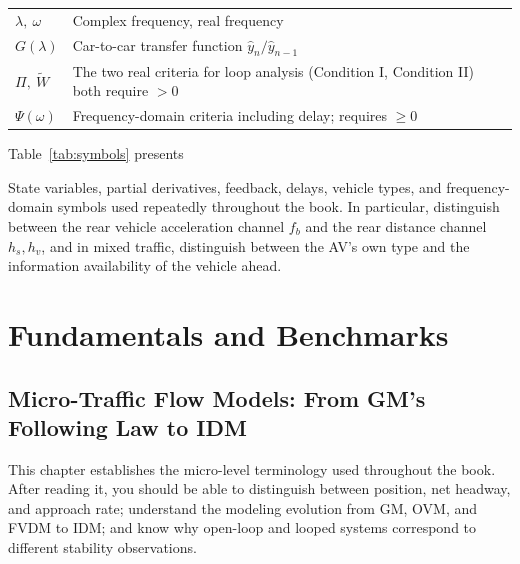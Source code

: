 \documentclass[11pt,a4paper,openany]{book}
\numberwithin{equation}{chapter}
\numberwithin{figure}{chapter}
\numberwithin{table}{chapter}
\newcommand{\tabletext}[2]{%
  \par\smallskip\noindent
  Table~\ref{#1} presents #2
\par\smallskip
}
\newcommand{\PART}[2]{%
  \part{#2}}
\newcommand{\chapterguide}[2]{%
  \begin{tcolorbox}[chapterguide,title=\textbf{Chapter Guide: #1}]
  #2
  \end{tcolorbox}}
\begin{document}
\begin{center}
\begin{tabular}{p{2.4cm}p{11.4cm}}
\\
$\lambda,\ \omega$ &




 Complex frequency, real frequency



\\
$G(\lambda)$ &




Car-to-car transfer function $\hat y_n/\hat y_{n-1}$



\\
$\Pi,\ \widetilde W$ &




The two real criteria for loop analysis (Condition I, Condition II) both require $>0$\\
$\Psi(\omega)$ & Frequency-domain criteria including delay; requires $\ge0$



\\
\bottomrule
\end{tabular}
\end{center}
\tabletext{tab:symbols}{




State variables, partial derivatives, feedback, delays, vehicle types, and frequency-domain symbols used repeatedly throughout the book. In particular, distinguish between the rear vehicle acceleration channel $f_b$ and the rear distance channel $h_s,h_v$, and in mixed traffic, distinguish between the AV’s own type and the information availability of the vehicle ahead.
}

\clearpage
\mainmatter
\PART{I}{Fundamentals and Benchmarks}

\chapter{Micro-Traffic Flow Models: From GM’s Following Law to IDM}
\label{sec:micro-introduction}
\chapterguide{How Following Models Express Driving Behavior as Dynamical Equations}{




This chapter establishes the micro-level terminology used throughout the book. After reading it, you should be able to distinguish between position, net headway, and approach rate; understand the modeling evolution from GM, OVM, and FVDM to IDM; and know why open-loop and looped systems correspond to different stability observations.}
\end{document}
